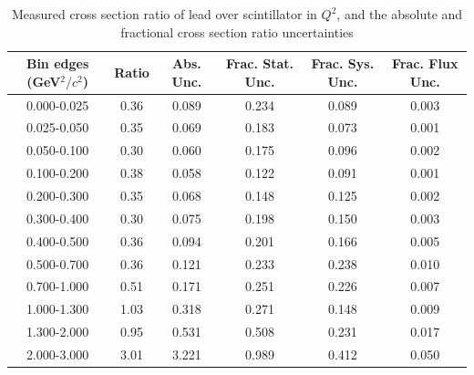 \documentclass[../main.tex]{subfiles}
\begin{document}
\begin{table}
  \centering
  \renewcommand{\arraystretch}{1.15}
  \caption{Measured cross section ratio of lead over scintillator in $Q^2$, and the absolute and fractional cross section ratio uncertainties}
    \begin{tabular}{c||c|c||c|c|c}
      Bin edges (GeV${}^2/c{}^2$) &  Ratio  &  Abs. Unc.  &  Frac. Stat. Unc.  &  Frac. Sys. Unc.  &  Frac. Flux Unc. \\
      \hline
      \hline
      0.000-0.025 & 0.36 & 0.089 & 0.234 & 0.089 & 0.003\\
      0.025-0.050 & 0.35 & 0.069 & 0.183 & 0.073 & 0.001\\
      0.050-0.100 & 0.30 & 0.060 & 0.175 & 0.096 & 0.002\\
      0.100-0.200 & 0.38 & 0.058 & 0.122 & 0.091 & 0.001\\
      0.200-0.300 & 0.35 & 0.068 & 0.148 & 0.125 & 0.002\\
      0.300-0.400 & 0.30 & 0.075 & 0.198 & 0.150 & 0.003\\
      0.400-0.500 & 0.36 & 0.094 & 0.201 & 0.166 & 0.005\\
      0.500-0.700 & 0.36 & 0.121 & 0.233 & 0.238 & 0.010\\
      0.700-1.000 & 0.51 & 0.171 & 0.251 & 0.226 & 0.007\\
      1.000-1.300 & 1.03 & 0.318 & 0.271 & 0.148 & 0.009\\
      1.300-2.000 & 0.95 & 0.531 & 0.508 & 0.231 & 0.017\\
      2.000-3.000 & 3.01 & 3.221 & 0.989 & 0.412 & 0.050
    \end{tabular}
  \label{tbl:rationucleonnuc82q2a}
\end{table}
\pagebreak
\end{document}
